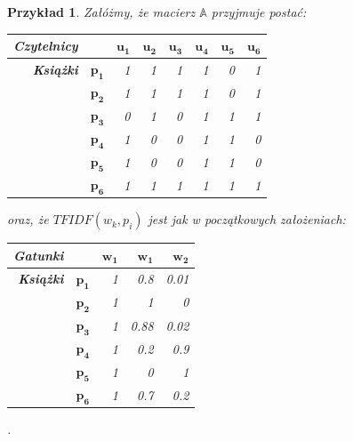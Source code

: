 \documentclass[12pt,a4paper]{report}
\newtheorem{przyklad}{Przykład}[chapter]
\begin{document}
\begin{przyklad}

Załóżmy, że macierz $\mathbb{A}$ przyjmuje postać:
\begin{center}
\begin{tabular}{|r|r|r|r|r|r|r|r|} \hline
\textbf{Czytelnicy} & & $\mathbf{u_1}$ & $\mathbf{u_2}$ & $\mathbf{u_3}$ & $\mathbf{u_4}$ & $\mathbf{u_5}$ & $\mathbf{u_6}$ \\
\hline
\hline
\textbf{Książki} &$\mathbf{p_1}$ & 1 & 1 & 1 & 1 & 0 & 1 \\
\hline
&$\mathbf{p_2}$ & 1 & 1 & 1 & 1 & 0 & 1 \\
\hline
&$\mathbf{p_3}$ & 0 & 1 & 0 & 1 & 1 & 1 \\
\hline
&$\mathbf{p_4}$ & 1 & 0 & 0 & 1 & 1 & 0 \\
\hline
&$\mathbf{p_5}$ & 1 & 0 & 0 & 1 & 1 & 0 \\
\hline
&$\mathbf{p_6}$ & 1 & 1 & 1 & 1 & 1 & 1 \\
\hline
\end{tabular}
\end{center}

oraz, że $TFIDF(w_k, p_i)$ jest jak w początkowych założeniach:
\begin{center}
\begin{tabular}{|r|r|r|r|r|} \hline
\textbf{Gatunki} & & $\mathbf{w_1}$ &  $\mathbf{w_1}$ & $\mathbf{w_2}$  \\
\hline
\hline
\textbf{Książki} &$\mathbf{p_1}$ & 1 & 0.8 & 0.01 \\
\hline
&$\mathbf{p_2}$ & 1 & 1 & 0  \\
\hline
&$\mathbf{p_3}$ & 1 & 0.88 & 0.02 \\
\hline
&$\mathbf{p_4}$ & 1 & 0.2 & 0.9 \\
\hline
&$\mathbf{p_5}$ & 1 & 0 & 1 \\
\hline
&$\mathbf{p_6}$ & 1 & 0.7 & 0.2 \\
\hline
\end{tabular}.
\end{center}


\end{przyklad}
\end{document}
